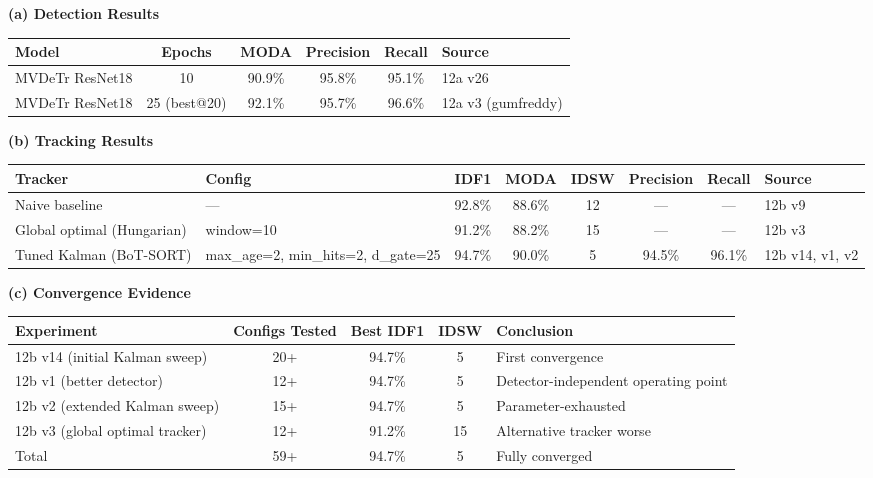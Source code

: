 \begingroup
\scriptsize
\setlength{\tabcolsep}{4pt}

\begin{minipage}{\textwidth}
\textbf{(a) Detection Results}

\begin{tabularx}{\textwidth}{l c c c c l}
\toprule
Model & Epochs & MODA & Precision & Recall & Source \\
\midrule
MVDeTr ResNet18 & 10 & 90.9\% & 95.8\% & 95.1\% & 12a v26 \\
MVDeTr ResNet18 & 25 (best@20) & 92.1\% & 95.7\% & 96.6\% & 12a v3 (gumfreddy) \\
\bottomrule
\end{tabularx}
\end{minipage}

\vspace{0.7em}

\begin{minipage}{\textwidth}
\textbf{(b) Tracking Results}

\begin{tabularx}{\textwidth}{l l c c c c c l}
\toprule
Tracker & Config & IDF1 & MODA & IDSW & Precision & Recall & Source \\
\midrule
Naive baseline & --- & 92.8\% & 88.6\% & 12 & --- & --- & 12b v9 \\
Global optimal (Hungarian) & window=10 & 91.2\% & 88.2\% & 15 & --- & --- & 12b v3 \\
Tuned Kalman (BoT-SORT) & max\_age=2, min\_hits=2, d\_gate=25 & 94.7\% & 90.0\% & 5 & 94.5\% & 96.1\% & 12b v14, v1, v2 \\
\bottomrule
\end{tabularx}
\end{minipage}

\vspace{0.7em}

\begin{minipage}{\textwidth}
\textbf{(c) Convergence Evidence}

\begin{tabularx}{\textwidth}{l c c c X}
\toprule
Experiment & Configs Tested & Best IDF1 & IDSW & Conclusion \\
\midrule
12b v14 (initial Kalman sweep) & 20+ & 94.7\% & 5 & First convergence \\
12b v1 (better detector) & 12+ & 94.7\% & 5 & Detector-independent operating point \\
12b v2 (extended Kalman sweep) & 15+ & 94.7\% & 5 & Parameter-exhausted \\
12b v3 (global optimal tracker) & 12+ & 91.2\% & 15 & Alternative tracker worse \\
Total & 59+ & 94.7\% & 5 & Fully converged \\
\bottomrule
\end{tabularx}
\end{minipage}

\endgroup